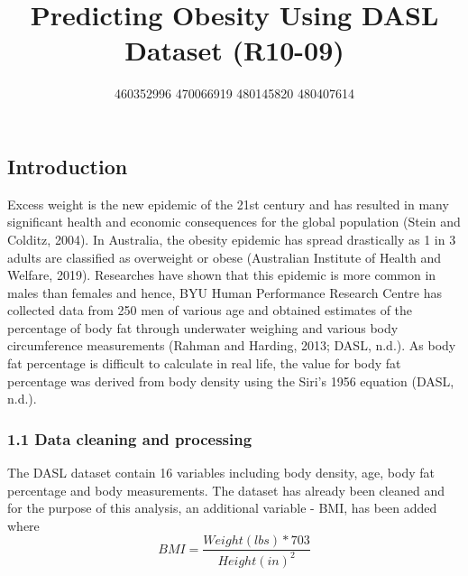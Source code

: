 \documentclass[a4paper,9pt,twocolumn,twoside,]{pinp}
\title{Predicting Obesity Using DASL Dataset (R10-09)}
\author[]{460352996 470066919 480145820 480407614}
\affil[]{GitHub code repository is
\href{https://github.sydney.edu.au/awon6941/DATA2002-M4.git}{here}}
\begin{document}
\verticaladjustment{-2pt}

\maketitle
\thispagestyle{firststyle}



\hypertarget{introduction}{%
\subsection{Introduction}\label{introduction}}

Excess weight is the new epidemic of the 21st century and has resulted
in many significant health and economic consequences for the global
population (Stein and Colditz, 2004). In Australia, the obesity epidemic
has spread drastically as 1 in 3 adults are classified as overweight or
obese (Australian Institute of Health and Welfare, 2019). Researches
have shown that this epidemic is more common in males than females and
hence, BYU Human Performance Research Centre has collected data from 250
men of various age and obtained estimates of the percentage of body fat
through underwater weighing and various body circumference measurements
(Rahman and Harding, 2013; DASL, n.d.). As body fat percentage is
difficult to calculate in real life, the value for body fat percentage
was derived from body density using the Siri's 1956 equation (DASL,
n.d.).

\hypertarget{data-cleaning-and-processing}{%
\subsubsection{1.1 Data cleaning and
processing}\label{data-cleaning-and-processing}}

The DASL dataset contain 16 variables including body density, age, body
fat percentage and body measurements. The dataset has already been
cleaned and for the purpose of this analysis, an additional variable -
BMI, has been added where
\[ BMI = \frac{Weight (lbs)*703}{Height(in)^2} \]
\end{document}
